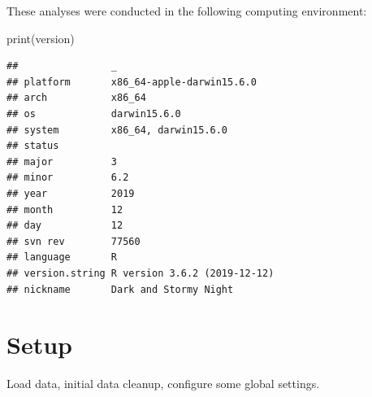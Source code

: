 \documentclass[
]{book}
\newenvironment{Shaded}{\begin{snugshade}}{\end{snugshade}}
\newcommand{\FunctionTok}[1]{\textcolor[rgb]{0.00,0.00,0.00}{#1}}
\newcommand{\NormalTok}[1]{#1}
\begin{document}
These analyses were conducted in the following computing environment:

\begin{Shaded}
\begin{Highlighting}[]
\FunctionTok{print}\NormalTok{(version)}
\end{Highlighting}
\end{Shaded}

\begin{verbatim}
##                _                           
## platform       x86_64-apple-darwin15.6.0   
## arch           x86_64                      
## os             darwin15.6.0                
## system         x86_64, darwin15.6.0        
## status                                     
## major          3                           
## minor          6.2                         
## year           2019                        
## month          12                          
## day            12                          
## svn rev        77560                       
## language       R                           
## version.string R version 3.6.2 (2019-12-12)
## nickname       Dark and Stormy Night
\end{verbatim}

\hypertarget{setup-3}{%
\section{Setup}\label{setup-3}}

Load data, initial data cleanup, configure some global settings.
\end{document}
